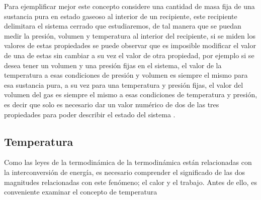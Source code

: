 \documentclass[../master.tex]{subfiles}
\begin{document}
Para ejemplificar mejor este concepto considere una cantidad de masa fija de una sustancia pura en estado gaseoso al interior de un recipiente, este recipiente delimitara el sistema cerrado que estudiaremos, de tal manera que se puedan medir la presión, volumen y temperatura al interior del recipiente, si se miden los valores de estas propiedades se puede observar que es imposible modificar el valor de una de estas sin cambiar a su vez el valor de otra propiedad, por ejemplo si se desea tener un volumen y una presión fijas en el sistema, el valor de la temperatura a esas condiciones de presión y volumen es siempre el mismo para esa sustancia pura, a su vez para una temperatura y presión fijas, el valor del volumen del gas es siempre el mismo a esas condiciones de temperatura y presión, es decir que solo es necesario dar un valor numérico de dos de las tres propiedades para poder describir el estado del sistema \parencite{clavell}.

\subsection{Temperatura}

Como las leyes de la termodinámica de la termodinámica están relacionadas con la interconversión de energía, es necesario comprender el significado de las dos magnitudes relacionadas con este fenómeno; el calor y el trabajo. Antes de ello, es conveniente examinar el concepto de temperatura

\clearpage
\renewcommand{\nomname}{Nomenclatura del capítlo}
\printnomenclature

\printbibliography[title=Bibliografía del capítulo]
\end{document}
